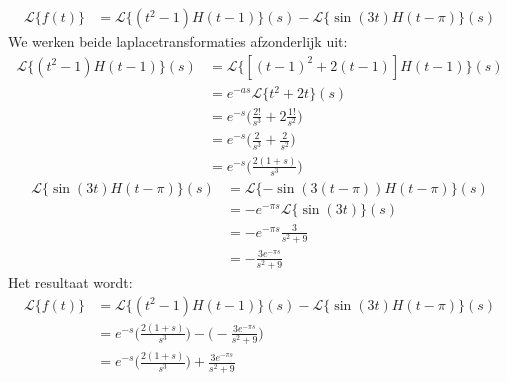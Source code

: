 \documentclass[12pt]{report}
\begin{document}
{
\begin{equation*}
 \begin{split}
  \mathcal{L}\{f(t)\} & = \mathcal{L}\{(t^2 - 1)H(t - 1)\}(s) - \mathcal{L}\{\sin(3t)H(t-\pi)\}(s)
 \end{split}
\end{equation*}
We werken beide laplacetransformaties afzonderlijk uit:
\begin{equation*}
 \begin{split}
  \mathcal{L}\{(t^2 - 1)H(t - 1)\}(s) & = \mathcal{L}\{[(t-1)^2 + 2(t - 1)]H(t - 1)\}(s)\\
                                      & = e^{-as}\mathcal{L}\{t^2 + 2t\}(s) \\
                                      & = e^{-s}\bigg(\frac{2!}{s^3} + 2\frac{1!}{s^2}\bigg) \\
                                      & = e^{-s}\bigg(\frac{2}{s^3} + \frac{2}{s^2}\bigg)\\
                                      & = e^{-s}\bigg(\frac{2(1 + s)}{s^3}\bigg)
 \end{split}
\end{equation*}
\begin{equation*}
 \begin{split}
   \mathcal{L}\{\sin(3t)H(t-\pi)\}(s) & =  \mathcal{L}\{-\sin(3(t - \pi))H(t-\pi)\}(s) \\
                                      & = -e^{-\pi s}\mathcal{L}\{\sin (3t)\}(s) \\
                                      & = -e^{-\pi s}\frac{3}{s^2 + 9} \\
                                      & = -\frac{3e^{-\pi s}}{s^2 + 9}
 \end{split}
\end{equation*}
Het resultaat wordt:
\begin{equation*}
 \begin{split}
  \mathcal{L}\{f(t)\} & = \mathcal{L}\{(t^2 - 1)H(t - 1)\}(s) - \mathcal{L}\{\sin(3t)H(t-\pi)\}(s) \\
                      & = e^{-s}\bigg(\frac{2(1 + s)}{s^3}\bigg) - \bigg(-\frac{3e^{-\pi s}}{s^2 + 9}\bigg) \\
                      & = e^{-s}\bigg(\frac{2(1 + s)}{s^3}\bigg) +\frac{3e^{-\pi s}}{s^2 + 9}
 \end{split}
\end{equation*}
}
\end{document}
